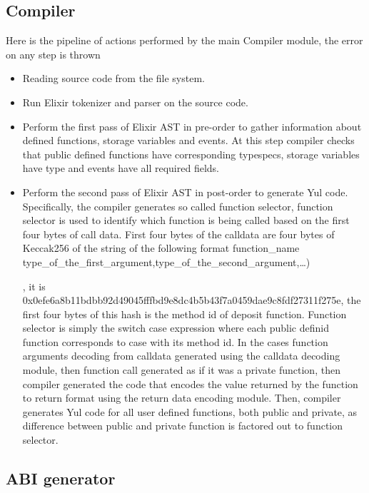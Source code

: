 \subsection{Compiler}
Here is the pipeline of actions performed by the main Compiler module, the error on any step is thrown  
\begin{itemize}
    \item Reading source code from the file system.
    \item Run Elixir tokenizer and parser on the source code.
    \item Perform the first pass of Elixir AST in pre-order to gather information about defined functions, storage variables and events. At this step compiler checks that public defined functions have corresponding typespecs, storage variables have type and events have all required fields.
    \item Perform the second pass of Elixir AST in post-order to generate Yul code. Specifically, the compiler generates so called function selector, function selector is used to identify which function is being called based on the first four bytes of call data. First four bytes of the calldata are four bytes of Keccak256 of the string of the following format function_name \lef type_of_the_first_argument,type_of_the_second_argument,\dots)
    
    , it is 0x0efe6a8b11bdbb92d49045fffbd9e8dc4b5b43f7a0459dae9c8fdf27311f275e, the first four bytes of this hash is the method id of deposit function. Function selector is simply the switch case expression where each public definid function corresponds to case with its method id. In the cases function arguments decoding from calldata generated using the calldata decoding module, then function call generated as if it was a private function, then compiler generated the code that encodes the value returned by the function to return format using the return data encoding module. Then, compiler generates Yul code for all user defined functions, both public and private, as difference between public and private function is factored out to function selector. 


\end{itemize}
\subsection{ABI generator}

